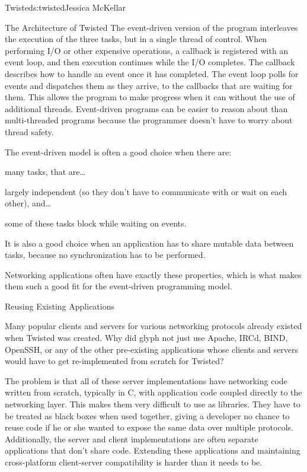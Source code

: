 \begin{aosachapter}{Twisted}{s:twisted}{Jessica McKellar}
\begin{aosasect1}{The Architecture of Twisted}
The event-driven version of the program interleaves the execution of the three
tasks, but in a single thread of control. When performing I/O or other expensive
operations, a callback is registered with an event loop, and then execution
continues while the I/O completes. The callback describes how to handle an event
once it has completed. The event loop polls for events and dispatches them as
they arrive, to the callbacks that are waiting for them. This allows the program
to make progress when it can without the use of additional threads. Event-driven
programs can be easier to reason about than multi-threaded programs because the
programmer doesn't have to worry about thread safety.

The event-driven model is often a good choice when there are:

\begin{aosaenumerate}

\item many tasks, that are\dots
\item largely independent (so they don't have to communicate with or
  wait on each other), and\ldots
\item some of these tasks block while waiting on events.

\end{aosaenumerate}

It is also a good choice when an application has to share mutable data
between tasks, because no synchronization has to be performed.

Networking applications often have exactly these properties, which is what
makes them such a good fit for the event-driven programming model.

\begin{aosasect2}{Reusing Existing Applications}

Many popular clients and servers for various networking protocols already
existed when Twisted was created. Why did glyph not just use Apache, IRCd, BIND,
OpenSSH, or any of the other pre-existing applications whose clients and servers
would have to get re-implemented from scratch for Twisted?

The problem is that all of these server implementations have networking code
written from scratch, typically in C, with application code coupled directly to
the networking layer. This makes them very difficult to use as libraries. 
They have to be treated as black boxes when used together, giving a developer no
chance to reuse code if he or she wanted to expose the same data over multiple
protocols. Additionally, the server and client implementations are often
separate applications that don't share code. Extending these applications and
maintaining cross-platform client-server compatibility is harder than it needs
to be.


\end{aosasect2}
\end{aosasect1}
\end{aosachapter}
